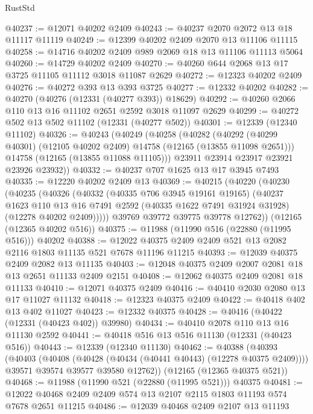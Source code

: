 \begin{lexlean}{RustStd}
\begin{coremodule}
@40237 := @12071 @40202 @2409
@40243 := @40237 @2070 @2072 @13 @18 @11117 @11119
@40249 := @12399 @40202 @2409 @2070 @13 @11106 @11115
@40258 := @14716 @40202 @2409 @989 @2069 @18 @13 @11106 @11113 @5064
@40260 := @14729 @40202 @2409
@40270 := @40260 @644 @2068 @13 @17 @3725 @11105 @11112 @3018 @11087 @2629
@40272 := @12323 @40202 @2409
@40276 := @40272 @393 @13 @393 @3725
@40277 := @12332 @40202
@40282 := @40270 (@40276 (@12331 (@40277 @393)) @18629)
@40292 := @40260 @2066 @110 @13 @16 @11102 @2651 @2592 @3018 @11097 @2629
@40299 := @40272 @502 @13 @502 @11102 (@12331 (@40277 @502))
@40301 := @12339 (@12340 @11102)
@40326 := @40243
    (@40249
      (@40258
        (@40282
          (@40292 (@40299 @40301) (@12105 @40202 @2409) @14758 (@12165 (@13855 @11098 @2651)))
          @14758
          (@12165 (@13855 @11088 @11105)))
        @23911
        @23914
        @23917
        @23921
        @23926
        @23932))
@40332 := @40237 @707 @1625 @13 @17 @3945 @7493
@40335 := @12220 @40202 @2409 @13
@40369 := @40215
    (@40220
      (@40230
        (@40235
          (@40326
            (@40332
              (@40335 @706 @3945 @19161 @19165)
              (@40237
                @1623
                @110
                @13
                @16
                @7491
                @2592
                (@40335 @1622 @7491 @31924 @31928)
                (@12278 @40202 @2409)))))
        @39769
        @39772
        @39775
        @39778
        @12762))
    (@12165 (@12365 @40202 @516))
@40375 := @11988 (@11990 @516 (@22880 (@11995 @516))) @40202
@40388 := @12022 @40375 @2409 @2409 @521 @13 @2082 @2116 @1803 @11135 @521 @7678 @11196 @11215
@40393 := @12039 @40375 @2409 @2082 @13 @11135
@40403 := @12048 @40375 @2409 @2007 @2081 @18 @13 @2651 @11133 @2409 @2151
@40408 := @12062 @40375 @2409 @2081 @18 @11133
@40410 := @12071 @40375 @2409
@40416 := @40410 @2030 @2080 @13 @17 @11027 @11132
@40418 := @12323 @40375 @2409
@40422 := @40418 @402 @13 @402 @11027
@40423 := @12332 @40375
@40428 := @40416 (@40422 (@12331 (@40423 @402)) @39980)
@40434 := @40410 @2078 @110 @13 @16 @11130 @2592
@40441 := @40418 @516 @13 @516 @11130 (@12331 (@40423 @516))
@40443 := @12339 (@12340 @11130)
@40462 := @40388
    (@40393
      (@40403
        (@40408 (@40428 (@40434 (@40441 @40443) (@12278 @40375 @2409))))
        @39571
        @39574
        @39577
        @39580
        @12762))
    (@12165 (@12365 @40375 @521))
@40468 := @11988 (@11990 @521 (@22880 (@11995 @521))) @40375
@40481 := @12022 @40468 @2409 @2409 @574 @13 @2107 @2115 @1803 @11193 @574 @7678 @2651 @11215
@40486 := @12039 @40468 @2409 @2107 @13 @11193

\end{coremodule}
\end{lexlean}
